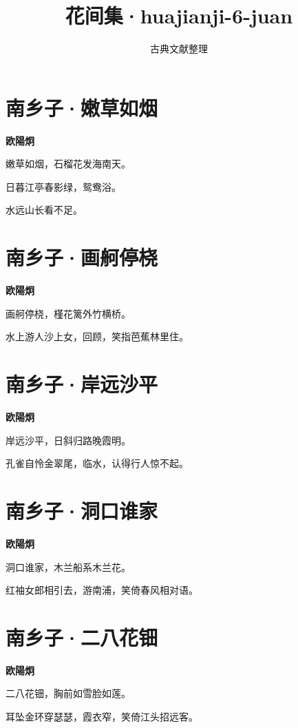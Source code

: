 \documentclass[12pt,a4paper]{ctexbook}
\title{花间集·huajianji-6-juan}
\author{古典文献整理}
\date{}
\begin{document}
\maketitle
\tableofcontents
\newpage
\section{南乡子·嫩草如烟}
\textbf{欧陽炯}\par\vspace{0.5em}
嫩草如烟，石榴花发海南天。\par
日暮江亭春影绿，鸳鸯浴。\par
水远山长看不足。\par

\section{南乡子·画舸停桡}
\textbf{欧陽炯}\par\vspace{0.5em}
画舸停桡，槿花篱外竹横桥。\par
水上游人沙上女，回顾，笑指芭蕉林里住。\par

\section{南乡子·岸远沙平}
\textbf{欧陽炯}\par\vspace{0.5em}
岸远沙平，日斜归路晚霞明。\par
孔雀自怜金翠尾，临水，认得行人惊不起。\par

\section{南乡子·洞口谁家}
\textbf{欧陽炯}\par\vspace{0.5em}
洞口谁家，木兰船系木兰花。\par
红袖女郎相引去，游南浦，笑倚春风相对语。\par

\section{南乡子·二八花钿}
\textbf{欧陽炯}\par\vspace{0.5em}
二八花钿，胸前如雪脸如莲。\par
耳坠金环穿瑟瑟，霞衣窄，笑倚江头招远客。\par
\end{document}
